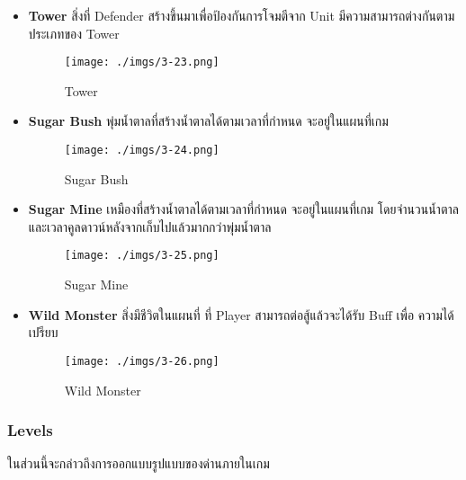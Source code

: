 \documentclass[12pt,oneside,openright,a4paper]{cpe-thai-project}
\begin{document}
\begin{itemize}
  \item \textbf{Tower} สิ่งที่ Defender สร้างขึ้นมาเพื่อป้องกันการโจมตีจาก Unit 				
  มีความสามารถต่างกันตามประเภทของ Tower
    
    \begin{figure}[H]\centering
      \texttt{[image: ./imgs/3-23.png]}
      \caption{Tower}\label{fig:3-23}
    \end{figure}

  \item \textbf{Sugar Bush} พุ่มน้ำตาลที่สร้างน้ำตาลได้ตามเวลาที่กำหนด จะอยู่ในแผนที่เกม
      
    \begin{figure}[H]\centering
      \texttt{[image: ./imgs/3-24.png]}
      \caption{Sugar Bush}\label{fig:3-24}
    \end{figure}

  \item \textbf{Sugar Mine} เหมืองที่สร้างน้ำตาลได้ตามเวลาที่กำหนด จะอยู่ในแผนที่เกม 
  โดยจำนวนน้ำตาลและเวลาคูลดาวน์หลังจากเก็บไปแล้วมากกว่าพุ่มน้ำตาล
      
    \begin{figure}[H]\centering
      \texttt{[image: ./imgs/3-25.png]}
      \caption{Sugar Mine}\label{fig:3-25}
    \end{figure}
  
  \item \textbf{Wild Monster} สิ่งมีชีวิตในแผนที่ ที่ Player สามารถต่อสู้แล้วจะได้รับ Buff เพื่อ
  ความได้เปรียบ

    \begin{figure}[H]\centering
      \texttt{[image: ./imgs/3-26.png]}
      \caption{Wild Monster}\label{fig:3-26}
    \end{figure}
\end{itemize}
  
\subsubsection{Levels}
ในส่วนนี้จะกล่าวถึงการออกแบบรูปแบบของด่านภายในเกม
\end{document}
